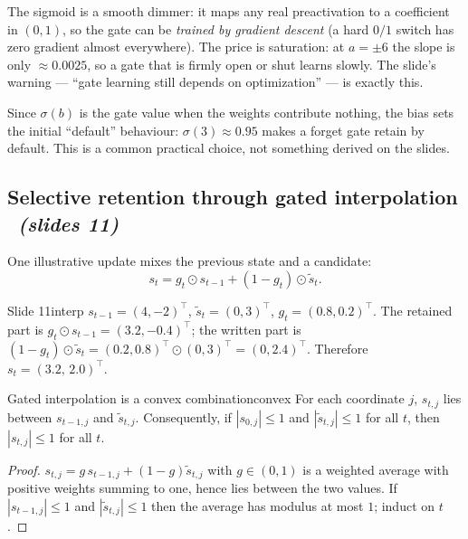 \documentclass[11pt,a4paper]{article}
\newcommand{\sltag}[1]{\texorpdfstring{\ \emph{(slides #1)}}{ (slides #1)}}
\begin{document}
\begin{intuition}
The sigmoid is a smooth dimmer: it maps any real preactivation to a coefficient in $(0,1)$, so the gate can be \emph{trained by gradient descent} (a hard $0/1$ switch has zero gradient almost everywhere). The price is saturation: at $a=\pm6$ the slope is only $\approx0.0025$, so a gate that is firmly open or shut learns slowly. The slide's warning --- ``gate learning still depends on optimization'' --- is exactly this.
\end{intuition}

\begin{remarkbox}
Since $\sigma(b)$ is the gate value when the weights contribute nothing, the bias sets the initial ``default'' behaviour: $\sigma(3)\approx0.95$ makes a forget gate retain by default. This is a common practical choice, not something derived on the slides.
\end{remarkbox}

\subsection{Selective retention through gated interpolation \sltag{11}}

One illustrative update mixes the previous state and a candidate:
\[
s_t=g_t\odot s_{t-1}+(1-g_t)\odot\tilde s_t .
\]
\begin{example}{Slide 11}{interp}
$s_{t-1}=(4,-2)^\top$, $\tilde s_t=(0,3)^\top$, $g_t=(0.8,0.2)^\top$. The retained part is $g_t\odot s_{t-1}=(3.2,-0.4)^\top$; the written part is $(1-g_t)\odot\tilde s_t=(0.2,0.8)^\top\odot(0,3)^\top=(0,2.4)^\top$. Therefore $s_t=(3.2,\,2.0)^\top$.
\end{example}

\begin{proposition}{Gated interpolation is a convex combination}{convex}
For each coordinate $j$, $s_{t,j}$ lies between $s_{t-1,j}$ and $\tilde s_{t,j}$. Consequently, if $|s_{0,j}|\le1$ and $|\tilde s_{t,j}|\le1$ for all $t$, then $|s_{t,j}|\le1$ for all $t$.
\end{proposition}
\begin{proof}
$s_{t,j}=g\,s_{t-1,j}+(1-g)\tilde s_{t,j}$ with $g\in(0,1)$ is a weighted average with positive weights summing to one, hence lies between the two values. If $|s_{t-1,j}|\le1$ and $|\tilde s_{t,j}|\le1$ then the average has modulus at most $1$; induct on $t$.
\end{proof}
\end{document}
